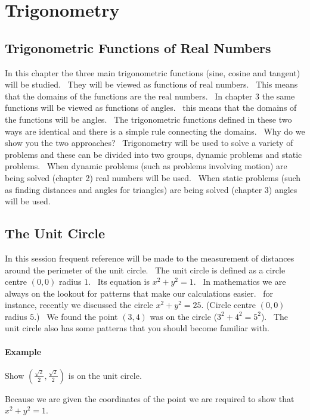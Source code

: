 \chapter{Trigonometry}

\section{Trigonometric Functions of Real Numbers}
In this chapter the three main trigonometric functions (sine, cosine and tangent) will be studied. \ They
will be viewed as functions of real numbers. \ This means that the domains of the functions are the real numbers.
\ In chapter 3 the same functions will be viewed as functions of angles. \ this
means that the domains of the functions will be angles. \ The trigonometric functions defined in these two ways
are identical and there is a simple rule connecting the domains. \ Why do we show you the two approaches? \ Trigonometry
will be used to solve a variety of problems and these can be divided into two groups, dynamic problems and static problems. \ When
dynamic problems (such as problems involving motion) are being solved (chapter 2) real numbers will be used. \ When
static problems (such as finding distances and angles for triangles) are being solved (chapter 3) angles will be used. 

\section{The Unit Circle}
In this session frequent reference will be made to the measurement of distances around the perimeter
of the unit circle. \ The unit circle is defined as a circle centre $\left (0 ,0\right )$ radius $1$. \ Its equation is $x^{2} +y^{2} =1$. \ In mathematics we are always on the lookout for patterns that make our calculations
easier. \ for instance, recently we discussed the circle $x^{2} +y^{2} =25$. (Circle centre $\left (0 ,0\right )$ radius $5$.) \ We found the point $\left (3 ,4\right )$ was on the circle ($3^{2} +4^{2} =5^{2}$). \ The unit circle also has some patterns that you should become familiar with. 

\subsubsection{Example}
Show $\left (\frac{\sqrt{2}}{2} ,\frac{\sqrt{2}}{2}\right )$ is on the unit circle. 

Because we are given
the coordinates of the point we are required to show that $x^{2} +y^{2} =1$. 


